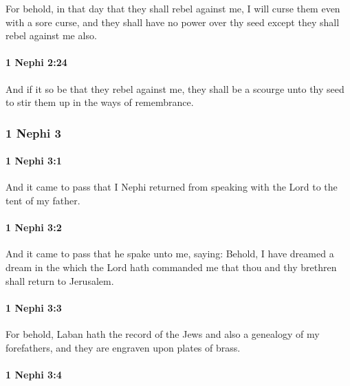 			For behold, in that day that they shall rebel against me,
			I will curse them even with a sore curse,
			and they shall have no power over thy seed
			except they shall rebel against me also.

		\paragraph{1 Nephi 2:24} %
			\label{1NEPHI-2-24}

			And if it so be that they rebel against me,
			they shall be a scourge unto thy seed
			to stir them up in the ways of remembrance.
			
	\subsubsection{1 Nephi 3} %
		\label{1NEPHI-3}
		
		\paragraph{1 Nephi 3:1} %
			\label{1NEPHI-3-1}

			And it came to pass that I Nephi returned
			from speaking with the Lord to the tent of my father.

		\paragraph{1 Nephi 3:2} %
			\label{1NEPHI-3-2}

			And it came to pass that he spake unto me, saying:
			Behold, I have dreamed a dream
			in the which the Lord hath commanded me
			that thou and thy brethren shall return to Jerusalem.

		\paragraph{1 Nephi 3:3} %
			\label{1NEPHI-3-3}

			For behold, Laban hath the record of the Jews
			and also a genealogy of my forefathers,
			and they are engraven upon plates of brass.

		\paragraph{1 Nephi 3:4} %
			\label{1NEPHI-3-4}

